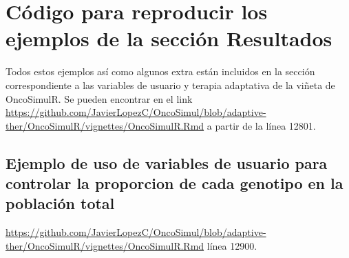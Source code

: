 \chapter{Código para  reproducir los ejemplos de la sección Resultados \label{sec:ejemplos}}\label{A}

Todos estos ejemplos así como algunos extra están incluidos en la sección correspondiente a las variables de usuario y terapia adaptativa de la viñeta de OncoSimulR. Se pueden encontrar en el link \url{https://github.com/JavierLopezC/OncoSimul/blob/adaptive-ther/OncoSimulR/vignettes/OncoSimulR.Rmd} a partir de la línea 12801. 
\section{Ejemplo  de uso de variables de usuario para controlar la proporcion de cada genotipo en la población total}\label{A.1}

\url{https://github.com/JavierLopezC/OncoSimul/blob/adaptive-ther/OncoSimulR/vignettes/OncoSimulR.Rmd} línea 12900.

